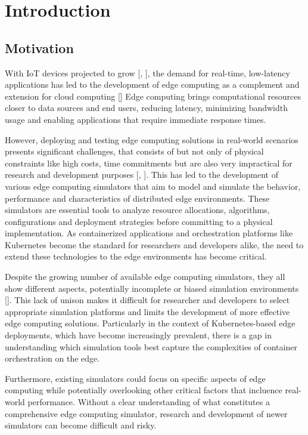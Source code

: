 \chapter{Introduction}
\section{Motivation}
  With IoT devices projected to grow [\cite{7488250}, \cite{10258346}], the demand for real-time, low-latency applications has led to the development of edge computing as a complement and extension for cloud computing [\cite{ASHOURI2021100346}]
  Edge computing brings computational resources closer to data sources and end users, reducing latency, minimizing bandwidth usage and enabling applications that require immediate response times.

  However, deploying and testing edge computing solutions in real-world scenarios presents significant challenges, that consists of but not only of physical constraints like high costs, time commitments but are also very impractical for research and development purposes [\cite{ASHOURI2021100346}, \cite{7488250}].
  This has led to the development of various edge computing simulators that aim to model and simulate the behavior, performance and characteristics of distributed edge environments.
  These simulators are essential tools to analyze resource allocations, algorithms, configurations and deployment strategies before committing to a physical implementation.
  As containerized applications and orchestration platforms like Kubernetes become the standard for researchers and developers alike, the need to extend these technologies to the edge environments has become critical.


  Despite the growing number of available edge computing simulators, they all show different aspects, potentially incomplete or biased simulation environments [\cite{ASHOURI2021100346}].
  This lack of unison makes it difficult for researcher and developers to select appropriate simulation platforms and limits the development of more effective edge computing solutions.
  Particularly in the context of Kubernetes-based edge deployments, which have become increasingly prevalent, there is a gap in understanding which simulation tools best capture the complexities of container orchestration on the edge.


  Furthermore, existing simulators could focus on specific aspects of edge computing while potentially overlooking other critical factors that incluence real-world performance.
  Without a clear understanding of what constitutes a comprehensive edge computing simulator, research and development of newer simulators can become difficult and risky.

